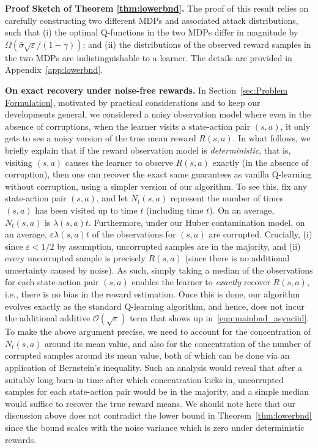 \documentclass{article}
\newcommand{\mc}{\mathcal}
\begin{document}
\textbf{Proof Sketch of  Theorem \ref{thm:lowerbnd}.} The proof of this result relies on carefully constructing two different MDPs and associated attack distributions, such that (i) the optimal Q-functions in the two MDPs differ in magnitude by $\Omega(\bar{\sigma} \sqrt{\varepsilon}/ (1-\gamma))$; and (ii) the distributions of the observed reward samples in the two MDPs are indistinguishable to a learner. The details are provided in Appendix~\ref{app:lowerbnd}. 

\noindent \textbf{On exact recovery under noise-free rewards.} In Section~\ref{sec:Problem Formulation}, motivated by practical considerations and to keep our developments general, we considered a noisy observation model where even in the absence of corruptions, when the learner visits a state-action pair $(s,a)$, it only gets to see a noisy version of the true mean reward $R(s,a).$ In what follows, we briefly explain that if the reward observation model is \emph{deterministic}, that is, visiting $(s,a)$ causes the learner to observe $R(s,a)$ exactly (in the absence of corruption), then one can recover the exact same guarantees as vanilla Q-learning without corruption, using a simpler version of our algorithm. To see this, fix any state-action pair $(s,a)$, and let $N_t(s,a)$ represent the number of times $(s,a)$ has been visited up to time $t$ (including time $t$). On an average, $N_t(s,a)$ is $\lambda(s,a) t$. Furthermore, under our Huber contamination model, on an average,  $\varepsilon \lambda(s,a) t$ of the observations for $(s,a)$ are corrupted. Crucially, (i) since $\varepsilon < 1/2$ by assumption, uncorrupted samples are in the majority, and (ii) every uncorrupted sample is precisely $R(s,a)$ (since there is no additional uncertainty caused by noise). As such, simply taking a median of the observations for each  state-action pair $(s,a)$ enables the learner to \emph{exactly} recover $R(s,a)$, i.e., there is no bias in the reward estimation. Once this is done, our algorithm evolves exactly as the standard Q-learning algorithm, and hence, does not incur the additional additive $\mc{O}(\sqrt{\varepsilon})$ term that shows up in~\eqref{eqn:mainbnd_asynciid}. To make the above argument precise, we need to account for the concentration of $N_t(s,a)$ around its mean value, and also for the concentration of the number of corrupted samples around its mean value, both of which can be done via an application of Bernstein's inequality. Such an analysis would reveal that after a suitably long burn-in time after which concentration kicks in, uncorrupted samples for each state-action pair would be in the majority, and a simple median would suffice to recover the true reward means. We should note here that our discussion above does not contradict the lower bound in Theorem~\ref{thm:lowerbnd} since the bound scales with the noise variance which is zero under deterministic rewards.
\vspace{-3mm}
\end{document}
